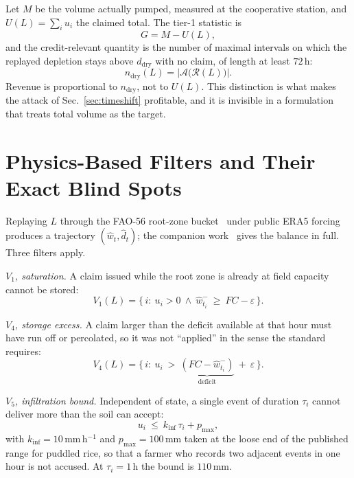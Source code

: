 \documentclass[journal]{IEEEtran}
\begin{document}
Let $M$ be the volume actually pumped, measured at the cooperative station, and
$U(L)=\sum_i u_i$ the claimed total. The tier-1 statistic is
\begin{equation}
G=M-U(L),
\label{eq:gap}
\end{equation}
and the credit-relevant quantity is the number of maximal intervals on which the
replayed depletion stays above $d_{\mathrm{dry}}$ with no claim, of length at
least $72$\,h:
\begin{equation}
n_{\mathrm{dry}}(L)=\bigl|\mathcal{A}\bigl(\mathcal{R}(L)\bigr)\bigr|.
\label{eq:ndry}
\end{equation}
Revenue is proportional to $n_{\mathrm{dry}}$, not to $U(L)$. This distinction is
what makes the attack of Sec.~\ref{sec:timeshift} profitable, and it is invisible
in a formulation that treats total volume as the target.

\section{Physics-Based Filters and Their Exact Blind Spots}
\label{sec:filters}

Replaying $L$ through the FAO-56 root-zone bucket~\cite{fao56} under public ERA5
forcing produces a trajectory $(\hat w_t,\hat d_t)$; the companion
work~\cite{twingate2026} gives the balance in full. Three filters apply.

\emph{$V_1$, saturation.} A claim issued while the root zone is already at field
capacity cannot be stored:
\begin{equation}
V_1(L)=\{\,i:\ u_i>0\ \wedge\ \hat w_{t_i}^{-}\ \ge\ FC-\varepsilon\,\}.
\label{eq:v1}
\end{equation}

\emph{$V_4$, storage excess.} A claim larger than the deficit available at that
hour must have run off or percolated, so it was not ``applied'' in the sense the
standard requires:
\begin{equation}
V_4(L)=\{\,i:\ u_i\ >\ \underbrace{(FC-\hat w_{t_i}^{-})}_{\text{deficit}}
\ +\ \varepsilon\,\}.
\label{eq:v4}
\end{equation}

\emph{$V_5$, infiltration bound.} Independent of state, a single event of
duration $\tau_i$ cannot deliver more than the soil can accept:
\begin{equation}
u_i\ \le\ k_{\mathrm{inf}}\,\tau_i+p_{\max},
\label{eq:v5}
\end{equation}
with $k_{\mathrm{inf}}=10$\,mm\,h$^{-1}$ and $p_{\max}=100$\,mm taken at the
loose end of the published range for puddled rice, so that a farmer who records
two adjacent events in one hour is not accused. At $\tau_i=1$\,h the bound is
$110$\,mm.
\end{document}
